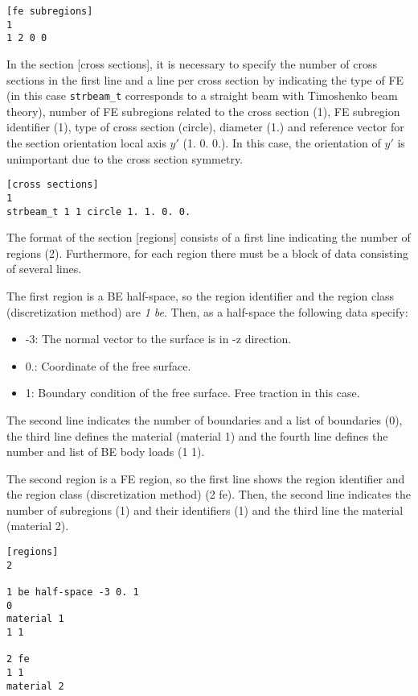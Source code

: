 \documentclass[a4]{article}
\begin{document}
\begin{Verbatim}
[fe subregions]
1
1 2 0 0
\end{Verbatim}

In the section [cross sections], it is necessary to specify the number of cross sections in the first line and a line per cross section by indicating the type of FE (in this case \texttt{strbeam\_t} corresponds to a straight beam with Timoshenko beam theory), number of FE subregions related to the cross section (1), FE subregion identifier (1), type of cross section (circle), diameter (1.) and reference vector for the section orientation local axis $y'$ (1. 0. 0.). In this case, the orientation of $y'$ is unimportant due to the cross section symmetry.

\begin{Verbatim}
[cross sections]
1
strbeam_t 1 1 circle 1. 1. 0. 0.
\end{Verbatim}

The format of the section [regions] consists of a first line indicating the number of regions (2). Furthermore, for each region there must be a block of data consisting of several lines. 

The first region is a BE half-space, so the region identifier and the region class (discretization method) are \emph{1 be}. Then, as a half-space the following data specify:

\begin{itemize}
	\item -3: The normal vector to the surface is in -z direction.
	\item 0.: Coordinate of the free surface.
	\item 1: Boundary condition of the free surface. Free traction in this case. 
\end{itemize}

The second line indicates the number of boundaries and a list of boundaries (0), the third line defines the material (material 1) and the fourth line defines the number and list of BE body loads (1 1).

The second region is a FE region, so the first line shows the region identifier and the region class (discretization method) (2 fe). Then, the second line indicates the number of subregions (1) and their identifiers (1) and the third line the material (material 2). 

\begin{Verbatim}	
[regions]
2

1 be half-space -3 0. 1
0
material 1
1 1

2 fe
1 1
material 2
\end{Verbatim}
\end{document}
